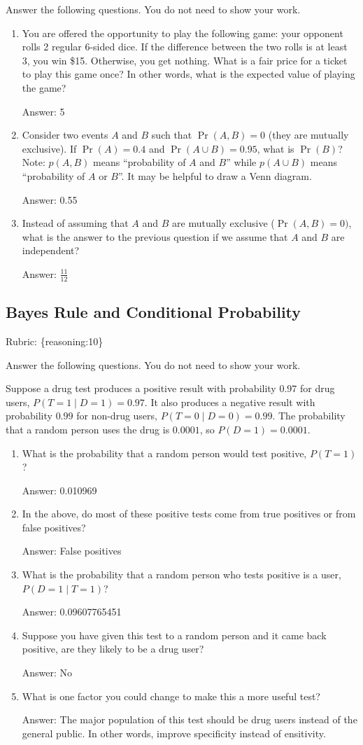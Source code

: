 \documentclass{article}
\def\rubric#1{\gre{Rubric: \{#1\}}}{}
\def\ans#1{\par\gre{Answer: #1}}
\def\blu#1{{\color{blu}#1}}
\def\gre#1{{\color{gre}#1}}
\begin{document}
\blu{Answer the following questions.} You do not need to show your work.


\begin{enumerate}
\item You are offered the opportunity to play the following game: your opponent rolls 2 regular 6-sided dice. If the difference between the two rolls is at least 3, you win \$15. Otherwise, you get nothing. What is a fair price for a ticket to play this game once? In other words, what is the expected value of playing the game?
\ans{5}
\item Consider two events $A$ and $B$ such that $\Pr(A, B)=0$ (they are mutually exclusive). If $\Pr(A) = 0.4$ and $\Pr(A \cup B) = 0.95$, what is $\Pr(B)$? Note: $p(A, B)$ means
``probability of $A$ and $B$'' while $p(A \cup B)$ means ``probability of $A$ or $B$''. It may be helpful to draw a Venn diagram.
\ans{0.55}
\item Instead of assuming that $A$ and $B$ are mutually exclusive ($\Pr(A,B) = 0)$, what is the answer to the previous question if we assume that $A$ and $B$ are independent?
\ans{$\frac{11}{12}$}

\end{enumerate}

\subsection{Bayes Rule and Conditional Probability}
\rubric{reasoning:10}

\blu{Answer the following questions.} You do not need to show your work.

Suppose a drug test produces a positive result with probability $0.97$ for drug users, $P(T=1 \mid D=1)=0.97$. It also produces a negative result with probability $0.99$ for non-drug users, $P(T=0 \mid D=0)=0.99$. The probability that a random person uses the drug is $0.0001$, so $P(D=1)=0.0001$.

\begin{enumerate}
\item What is the probability that a random person would test positive, $P(T=1)$?
\ans{0.010969}
\item In the above, do most of these positive tests come from true positives or from false positives?
\ans{False positives}
\item What is the probability that a random person who tests positive is a user, $P(D=1 \mid T=1)$?
\ans{0.09607765451}
\item Suppose you have given this test to a random person and it came back positive, are they likely to be a drug user?
\ans{No}
\item What is one factor you could change to make this a more useful test?
\ans{The major population of this test should be drug users instead of the general public. In other words, improve specificity instead of ensitivity.}
\end{enumerate}
\end{document}
